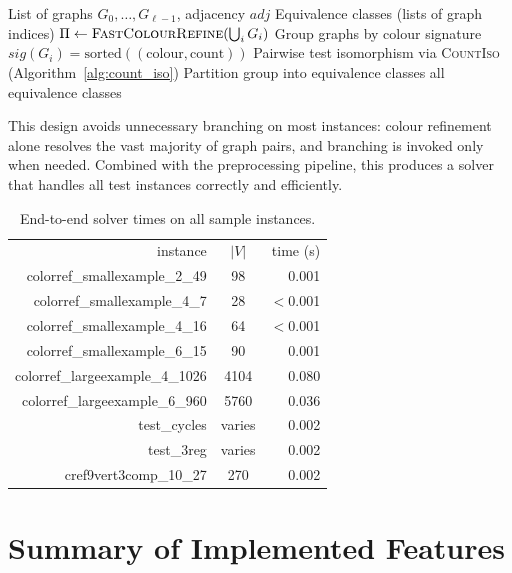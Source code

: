 \documentclass[twoside]{article}
\begin{document}
\begin{algorithm}[H]
\caption{FindEquivalenceClasses (GI with colour refinement fast-path)}\label{alg:find_eq}
\begin{algorithmic}[1]
\Require List of graphs $G_0, \ldots, G_{\ell-1}$, adjacency $\textit{adj}$
\Ensure Equivalence classes (lists of graph indices)
\State $\Pi \gets \textsc{FastColourRefine}(\bigcup_i G_i)$
\State Group graphs by colour signature $\textit{sig}(G_i) = \text{sorted}((\text{colour}, \text{count}))$
    \State Pairwise test isomorphism via \textsc{CountIso} (Algorithm~\ref{alg:count_iso})
    \State Partition group into equivalence classes
\EndFor
\State \Return all equivalence classes
\end{algorithmic}
\end{algorithm}

This design avoids unnecessary branching on most instances: colour refinement alone resolves the vast majority of graph pairs, and branching is invoked only when needed. Combined with the preprocessing pipeline, this produces a solver that handles all test instances correctly and efficiently.

\begin{table}[H]
\centering
\begin{tabular}{r|c|r}
instance & $|V|$ & time (s)\\
\noalign{\smallskip}\hline\hline\noalign{\smallskip}
colorref\_smallexample\_2\_49    & 98   & 0.001 \\
colorref\_smallexample\_4\_7     & 28   & $<$0.001 \\
colorref\_smallexample\_4\_16    & 64   & $<$0.001 \\
colorref\_smallexample\_6\_15    & 90   & 0.001 \\
colorref\_largeexample\_4\_1026  & 4104 & 0.080 \\
colorref\_largeexample\_6\_960   & 5760 & 0.036 \\
test\_cycles                     & varies & 0.002 \\
test\_3reg                       & varies & 0.002 \\
cref9vert3comp\_10\_27           & 270 & 0.002 \\
\end{tabular}
\caption{End-to-end solver times on all sample instances.}\label{tab:solver}
\end{table}


\section{Summary of Implemented Features}
\end{document}
